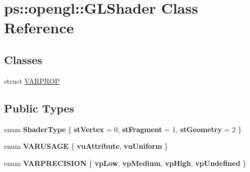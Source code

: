 \hypertarget{classps_1_1opengl_1_1GLShader}{}\section{ps\+:\+:opengl\+:\+:G\+L\+Shader Class Reference}
\label{classps_1_1opengl_1_1GLShader}
\subsection*{Classes}
\begin{DoxyCompactItemize}
\item 
struct \hyperlink{structps_1_1opengl_1_1GLShader_1_1VARPROP}{V\+A\+R\+P\+R\+O\+P}
\end{DoxyCompactItemize}
\subsection*{Public Types}
\begin{DoxyCompactItemize}
\item 
\hypertarget{classps_1_1opengl_1_1GLShader_a8d6d57f75b21d839dcb2096312a46d7d}{}enum {\bfseries Shader\+Type} \{ {\bfseries st\+Vertex} = 0, 
{\bfseries st\+Fragment} = 1, 
{\bfseries st\+Geometry} = 2
 \}\label{classps_1_1opengl_1_1GLShader_a8d6d57f75b21d839dcb2096312a46d7d}

\item 
\hypertarget{classps_1_1opengl_1_1GLShader_af769c94af2bda54e8c9bd62eb744df6c}{}enum {\bfseries V\+A\+R\+U\+S\+A\+G\+E} \{ {\bfseries vu\+Attribute}, 
{\bfseries vu\+Uniform}
 \}\label{classps_1_1opengl_1_1GLShader_af769c94af2bda54e8c9bd62eb744df6c}

\item 
\hypertarget{classps_1_1opengl_1_1GLShader_ae33fd492bfa6b1cf991ed87ddcd55f46}{}enum {\bfseries V\+A\+R\+P\+R\+E\+C\+I\+S\+I\+O\+N} \{ {\bfseries vp\+Low}, 
{\bfseries vp\+Medium}, 
{\bfseries vp\+High}, 
{\bfseries vp\+Undefined}
 \}\label{classps_1_1opengl_1_1GLShader_ae33fd492bfa6b1cf991ed87ddcd55f46}

\end{DoxyCompactItemize}
